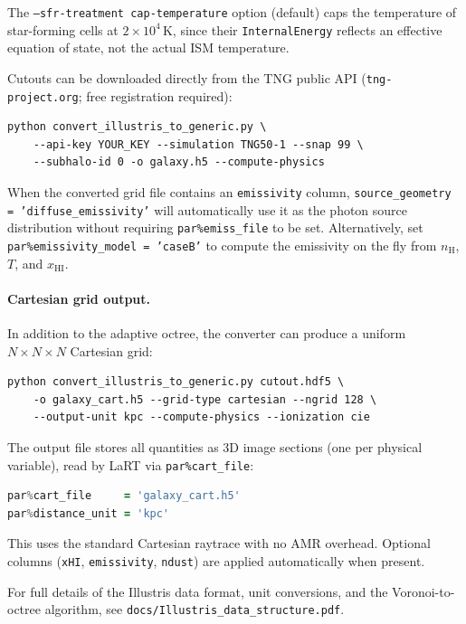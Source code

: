 \documentclass[english,a4paper]{my_memo}
\begin{document}
The \texttt{--sfr-treatment cap-temperature} option (default) caps the
temperature of star-forming cells at $2\times10^4$\,K, since their
\texttt{InternalEnergy} reflects an effective equation of state, not the
actual ISM temperature.

Cutouts can be downloaded directly from the TNG public API
(\texttt{tng-project.org}; free registration required):

\begin{lstlisting}[language={}]
python convert_illustris_to_generic.py \
    --api-key YOUR_KEY --simulation TNG50-1 --snap 99 \
    --subhalo-id 0 -o galaxy.h5 --compute-physics
\end{lstlisting}

When the converted grid file contains an \texttt{emissivity} column,
\texttt{source\_geometry = 'diffuse\_emissivity'} will automatically
use it as the photon source distribution without requiring
\texttt{par\%emiss\_file} to be set.  Alternatively, set
\texttt{par\%emissivity\_model = 'caseB'} to compute the emissivity
on the fly from $n_\mathrm{H}$, $T$, and $x_\mathrm{HI}$.

\paragraph{Cartesian grid output.}
In addition to the adaptive octree, the converter can produce a uniform
$N \times N \times N$ Cartesian grid:

\begin{lstlisting}[language={}]
python convert_illustris_to_generic.py cutout.hdf5 \
    -o galaxy_cart.h5 --grid-type cartesian --ngrid 128 \
    --output-unit kpc --compute-physics --ionization cie
\end{lstlisting}

The output file stores all quantities as 3D image sections (one per
physical variable), read by LaRT via \texttt{par\%cart\_file}:

\begin{lstlisting}[language=Fortran]
par%cart_file     = 'galaxy_cart.h5'
par%distance_unit = 'kpc'
\end{lstlisting}

This uses the standard Cartesian raytrace with no AMR overhead.
Optional columns (\texttt{xHI}, \texttt{emissivity}, \texttt{ndust})
are applied automatically when present.

For full details of the Illustris data format, unit conversions, and
the Voronoi-to-octree algorithm, see
\texttt{docs/Illustris\_data\_structure.pdf}.
\end{document}
